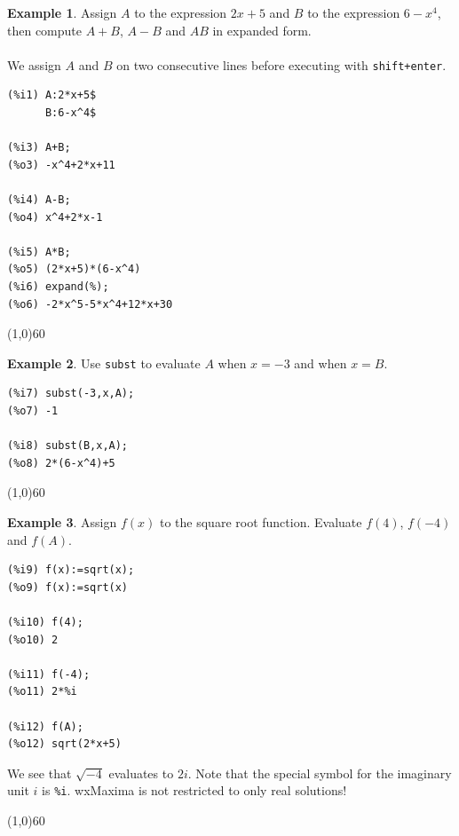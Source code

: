 \documentclass[10.5pt,twoside]{report}
\theoremstyle{definition}
\newtheorem{exmp}{Example}[section]
\begin{document}
\begin{exmp}  Assign $A$ to the expression $2x+5$ and $B$ to the expression $6-x^4$, then compute $A+B$, $A-B$ and $AB$ in expanded form.\\
${}$\\

We assign $A$ and $B$ on two consecutive lines before executing with \verb|shift+enter|.

\begin{verbatim}
(%i1) A:2*x+5$
      B:6-x^4$

(%i3) A+B;
(%o3) -x^4+2*x+11

(%i4) A-B;
(%o4) x^4+2*x-1

(%i5) A*B;
(%o5) (2*x+5)*(6-x^4)
(%i6) expand(%);
(%o6) -2*x^5-5*x^4+12*x+30
\end{verbatim}

\end{exmp}

\line(1,0){60}
\linethickness{0.5mm}

\begin{exmp}  Use \verb|subst| to evaluate $A$ when $x=-3$ and when $x=B$.\\


\begin{verbatim}
(%i7) subst(-3,x,A);
(%o7) -1

(%i8) subst(B,x,A);
(%o8) 2*(6-x^4)+5
\end{verbatim}

\end{exmp}

\line(1,0){60}
\linethickness{0.5mm}


\begin{exmp}  Assign $f(x)$ to the square root function.  Evaluate $f(4)$, $f(-4)$ and $f(A)$.\\


\begin{verbatim}
(%i9) f(x):=sqrt(x);
(%o9) f(x):=sqrt(x)

(%i10) f(4);
(%o10) 2

(%i11) f(-4);
(%o11) 2*%i

(%i12) f(A);
(%o12) sqrt(2*x+5)
\end{verbatim}

We see that $\sqrt{-4}$ evaluates to $2i$.  Note that the special symbol for the imaginary unit $i$ is \verb|%i|.  wxMaxima is not restricted to only real solutions!

\end{exmp}

\line(1,0){60}
\linethickness{0.5mm}
\end{document}
